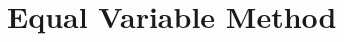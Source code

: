 \documentclass{subfile}
\begin{document}
	\chapter{Equal Variable Method}\label{ch:ev}
\end{document}
